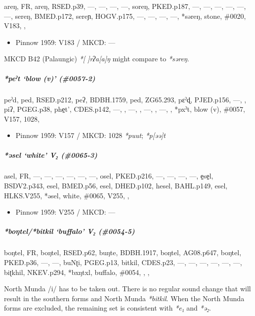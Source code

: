 \documentclass[a4paper,]{article}
\providecommand{\tightlist}{%
  \setlength{\itemsep}{0pt}\setlength{\parskip}{0pt}}
\let\oldsubparagraph\subparagraph
\renewcommand{\subparagraph}[1]{\oldsubparagraph{#1}\mbox{}}
\begin{document}
areŋ, FR, areŋ, RSED.p39, ---, ---, ---, ---, soreŋ, PKED.p187, ---,
---, ---, ---, ---, ---, sereŋ, BMED.p172, sereɲ, HOGV.p175, ---, ---,
---, ---, *səreŋ, stone, \#0020, V183, ,

\begin{itemize}
\tightlist
\item
  Pinnow 1959: V183 / MKCD: ---
\end{itemize}

MKCD B42 (Palaungic) \emph{*{[} {]}rʔa{[}a{]}ŋ} might compare to
\emph{*səreŋ}.

\subparagraph{\texorpdfstring{\emph{*peˀt} `blow (v)'
(\#0057-2)}{*peˀt blow (v) (\#0057-2)}}\label{peux2c0t-blow-v-0057-2}

peˀd, ped, RSED.p212, peʔ, BDBH.1759, ped, ZG65.293, pɛˀɖ, PJED.p156,
---, , piʔ, PGEG.p38, phe̠t', CDES.p142, ---, , ---, , ---, , ---, ,
*pxˀt, blow (v), \#0057, V157, 1028,

\begin{itemize}
\tightlist
\item
  Pinnow 1959: V157 / MKCD: 1028 \emph{*puut}; \emph{*p{[}əə{]}t}
\end{itemize}

\subparagraph{\texorpdfstring{\emph{*əsel} `white' V₂
(\#0065-3)}{*əsel white V₂ (\#0065-3)}}\label{ux259sel-white-v-0065-3}

asel, FR, ---, ---, ---, ---, ---, ---, osel, PKED.p216, ---, ---, ---,
---, e̠se̠l, BSDV2.p343, esel, BMED.p56, esel, DHED.p102, hesel,
BAHL.p149, esel, HLKS.V255, *əsel, white, \#0065, V255, ,

\begin{itemize}
\tightlist
\item
  Pinnow 1959: V255 / MKCD: ---
\end{itemize}

\subparagraph{\texorpdfstring{\emph{*boŋtel}/\emph{*bitkil} `buffalo' V₂
(\#0054-5)}{*boŋtel/*bitkil buffalo V₂ (\#0054-5)}}\label{boux14btelbitkil-buffalo-v-0054-5}

boŋtel, FR, boŋtel, RSED.p62, buŋte, BDBH.1917, boŋtel, AG08.p647,
boŋtel, PKED.p36, ---, ---, buNʈi, PGEG.p13, bitkil, CDES.p23, ---, ---,
---, ---, ---, ---, biʈkhil, NKEV.p294, *bxŋtxl, buffalo, \#0054, , ,

North Munda /i/ has to be taken out. There is no regular sound change
that will result in the southern forms and North Munda \emph{*bitkil}.
When the North Munda forms are excluded, the remaining set is consistent
with \emph{*e₁} and \emph{*ə₂}.
\end{document}
